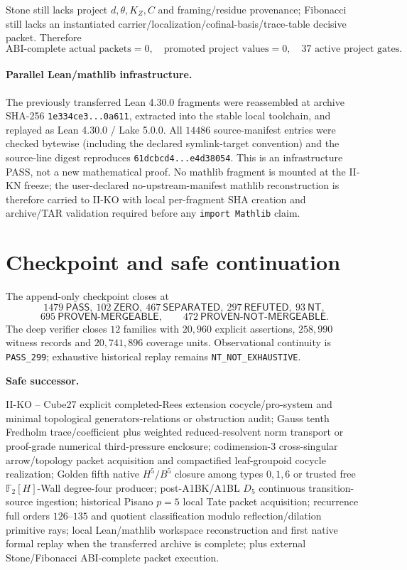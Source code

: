 \documentclass[9.5pt,a4paper]{article}
\newcommand{\PASS}{\textsf{PASS}}\newcommand{\ZERO}{\textsf{ZERO}}\newcommand{\SEP}{\textsf{SEPARATED}}\newcommand{\REF}{\textsf{REFUTED}}\newcommand{\NT}{\textsf{NT}}
\begin{document}
Stone still lacks project $d,\theta,K_Z,C$ and framing/residue provenance; Fibonacci still lacks an instantiated carrier/localization/cofinal-basis/trace-table decisive packet.  Therefore
\[
\boxed{\text{ABI-complete actual packets}=0,\quad\text{promoted project values}=0,\quad37\text{ active project gates}.}
\]

\paragraph{Parallel Lean/mathlib infrastructure.}
The previously transferred Lean 4.30.0 fragments were reassembled at archive SHA-256 \texttt{1e334ce3...0a611}, extracted into the stable local toolchain, and replayed as Lean 4.30.0 / Lake 5.0.0.  All $14486$ source-manifest entries were checked bytewise (including the declared symlink-target convention) and the source-line digest reproduces \texttt{61dcbcd4...e4d38054}.  This is an infrastructure \PASS{}, not a new mathematical proof.  No mathlib fragment is mounted at the II-KN freeze; the user-declared no-upstream-manifest mathlib reconstruction is therefore carried to II-KO with local per-fragment SHA creation and archive/TAR validation required before any \texttt{import Mathlib} claim.

\section{Checkpoint and safe continuation}
The append-only checkpoint closes at
\[
\boxed{1479\ \PASS,\ 102\ \ZERO,\ 467\ \SEP,\ 297\ \REF,\ 93\ \NT},
\]
\[
\boxed{695\ \textsf{PROVEN-MERGEABLE},\qquad472\ \textsf{PROVEN-NOT-MERGEABLE}.}
\]
The deep verifier closes $12$ families with $20{,}960$ explicit assertions, $258{,}990$ witness records and $20{,}741{,}896$ coverage units.  Observational continuity is \texttt{PASS\_299}; exhaustive historical replay remains \texttt{NT\_NOT\_EXHAUSTIVE}.

\par\noindent\textbf{Safe successor.}\par\smallskip
\begin{minipage}{\linewidth}\scriptsize\raggedright\sloppy
II-KO -- Cube27 explicit completed-Rees extension cocycle/pro-system and minimal topological generators-relations or obstruction audit; Gauss tenth Fredholm trace/coefficient plus weighted reduced-resolvent norm transport or proof-grade numerical third-pressure enclosure; codimension-3 cross-singular arrow/topology packet acquisition and compactified leaf-groupoid cocycle realization; Golden fifth native $H^5/B^5$ closure among types $0,1,6$ or trusted free $\mathbb F_2[H]$-Wall degree-four producer; post-A1BK/A1BL $D_5$ continuous transition-source ingestion; historical Pisano $p=5$ local Tate packet acquisition; recurrence full orders $126$--$135$ and quotient classification modulo reflection/dilation primitive rays; local Lean/mathlib workspace reconstruction and first native formal replay when the transferred archive is complete; plus external Stone/Fibonacci ABI-complete packet execution.
\end{minipage}
\end{document}
